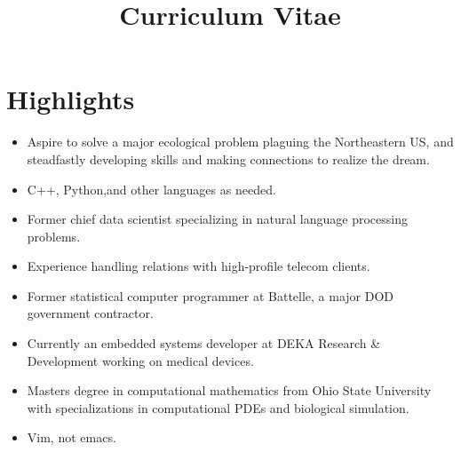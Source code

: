 \documentclass[11pt,a4paper,sans]{moderncv} %
\title{Curriculum Vitae}
\begin{document}
\makecvtitle %

\section{Highlights}
\begin{itemize}
\item Aspire to solve a major ecological problem plaguing the Northeastern US, and steadfastly developing skills and making connections to realize the dream.
\item C++, Python,and other languages as needed.
\item Former chief data scientist specializing in natural language processing problems.
\item Experience handling relations with high-profile telecom clients.
\item Former statistical computer programmer at Battelle, a major DOD government contractor.
\item Currently an embedded systems developer at DEKA Research \& Development working on medical devices.
\item Masters degree in computational mathematics from Ohio State University with specializations in computational PDEs and biological simulation.
\item Vim, not emacs.
\end{itemize}
\end{document}
